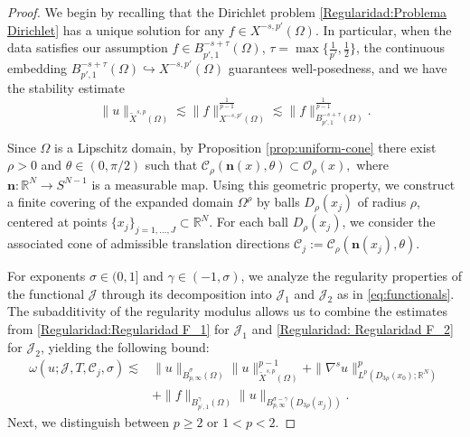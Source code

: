\documentclass[]{amsart}
\theoremstyle{definition}
\theoremstyle{definition}
\theoremstyle{remark}
\numberwithin{equation}{section}
\newcommand{\grads}{\nabla^{s}}
\begin{document}
	\begin{proof}
		We begin by recalling that the Dirichlet problem \eqref{Regularidad:Problema Dirichlet} has a unique solution for any \(f \in X^{-s,p'}(\Omega)\). In particular, when the data satisfies our assumption \(f \in B_{p',1}^{-s+\tau}(\Omega)\), $\tau = \max \{ \frac{1}{p'}, \frac12 \}$,
        the continuous embedding \(B_{p',1}^{-s+\tau}(\Omega) \hookrightarrow X^{-s,p'}(\Omega)\) guarantees well-posedness, and we have the stability estimate
		\begin{equation}
			\label{Regularidad: Cota de Estabilidad}
			\|u\|_{\widetilde{X}^{s,p}(\Omega)} \lesssim \|f\|_{X^{-s,p'}(\Omega)}^{\frac{1}{p-1}} \lesssim \|f\|_{B_{p',1}^{-s+\tau}(\Omega)}^{\frac{1}{p-1}}.
		\end{equation}
		
		Since \(\Omega\) is a Lipschitz domain, 
        by Proposition \ref{prop:uniform-cone} there exist \(\rho > 0\) and \(\theta \in (0, \pi/2)\) such that
        $\mathcal{C}_\rho(\boldsymbol{n}(x), \theta) \subset \mathcal{O}_\rho(x),
		$ where $\boldsymbol{n} \colon \mathbb{R}^N \to S^{N-1}$ is a measurable map.
       Using this geometric property, we construct a finite covering of the expanded domain \(\Omega^\rho\) by balls \(D_\rho(x_j)\) of radius \(\rho\), centered at points \(\{x_j\}_{j=1,\ldots,J} \subset \mathbb{R}^N\). For each ball \(D_\rho(x_j)\), we consider the associated cone of admissible translation directions \(\mathcal{C}_j := \mathcal{C}_\rho(\mathbf{n}(x_j), \theta)\). 
		
		For exponents \(\sigma \in (0,1]\) and \(\gamma \in (-1,\sigma)\), we analyze the regularity properties of the functional \(\mathcal{J}\) through its decomposition into \(\mathcal{J}_1\) and \(\mathcal{J}_2\) as in \eqref{eq:functionals}. The subadditivity of the regularity modulus allows us to combine the estimates from \eqref{Regularidad:Regularidad F_1} for \(\mathcal{J}_1\) and \eqref{Regularidad: Regularidad F_2} for \(\mathcal{J}_2\), yielding the following bound:
	\begin{equation}\label{Regularidad: Cota de regularidad para F}
        \begin{aligned}
			\omega\left(u ; \mathcal{J}, T, \mathcal{C}_{j}, \sigma\right) %
			\lesssim &\|u\|_{\dot{B}^{\sigma}_{p,\infty}(\Omega)}\|u\|^{p-1}_{\widetilde{X}^{s,p}(\Omega)}+\|\grads u\|^{p}_{L^{p}(D_{3\rho}(x_0); \mathbb{R}^N)} \\ & +\|f\|_{B_{p^{\prime}, 1}^{\gamma}\left(\Omega\right)}\|u\|_{B_{p, \infty}^{\sigma-\gamma}\left(D_{3 \rho}\left(x_{j}\right)\right)}.
		\end{aligned}\end{equation}
Next, we distinguish between $p \ge 2$ or $1<p<2$.
        

\end{proof}
\end{document}
